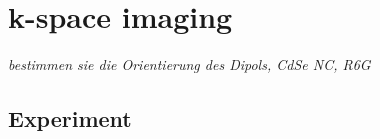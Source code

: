 

\chapter{k-space imaging}


\textit{bestimmen sie die Orientierung des Dipols, CdSe NC, R6G
}
\section{Experiment}

 




\printbibliography[segment=\therefsegment,heading=subbibliography]
